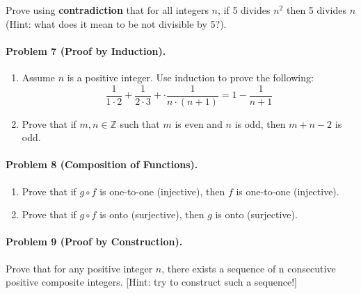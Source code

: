 \documentclass[letterpaper,11pt,twoside]{article}
\theoremstyle{plain}
\theoremstyle{definition}
\theoremstyle{remark}
\theoremstyle{restate}
\begin{document}
Prove using {\bf contradiction} that for all integers $n$, if 5 divides $n^2$ then 5 divides $n$ (Hint: what does it mean to be not divisible by 5?). 

\paragraph{Problem 7 (Proof by Induction).}
\begin{enumerate}
    \item Assume $n$ is a positive integer. Use induction to prove the following: $$ \frac{1}{1\cdot2} +  \frac{1}{2\cdot3} + \cdot  \frac{1}{n\cdot(n+1)} = 1 - \frac{1}{n+1} $$
    \item Prove that if $m, n \in \mathbb{Z} $ such that $m$ is even and $n$ is odd, then $m + n - 2$ is odd.

\end{enumerate}

\paragraph{Problem 8 (Composition of Functions).}

\begin{enumerate}
    \item   Prove that if $g \circ f $ is one-to-one (injective), then $f$ is one-to-one (injective).
    \item Prove that if $g \circ f$ is onto (surjective), then $g$ is onto (surjective).
\end{enumerate}

\paragraph{Problem 9 (Proof by Construction).}

Prove that for any positive integer $n$, there exists a sequence of n consecutive positive composite integers. [Hint: try to construct such a sequence!]



    
\end{document}
